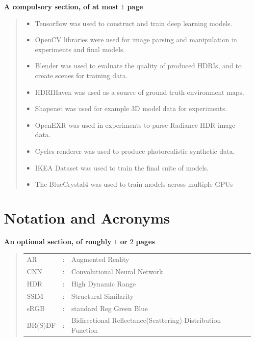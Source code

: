 \documentclass[ %
                    author={Gavin Parker},
                supervisor={Dr. Neill Campbell},
                    degree={MEng},
                     title={Deep Siamese Networks for Illumination Estimation from Stereo Images},
                  subtitle={},
                      type={research},
                      year={2018} ]{dissertation}
\begin{document}
{\bf A compulsory section, of at most $1$ page}
\vspace{1cm} 
\begin{quote}
\noindent
\begin{itemize}
\item Tensorflow was used to construct and train deep learning models.
\item OpenCV libraries were used for image parsing and manipulation in experiments and final models.
\item Blender was used to evaluate the quality of produced HDRIs, and to create scenes for training data.
\item HDRIHaven was used as a source of ground truth environment maps.
\item Shapenet was used for example 3D model data for experiments.
\item OpenEXR was used in experiments to parse Radiance HDR image data.
\item Cycles renderer was used to produce photorealistic synthetic data.
\item IKEA Dataset was used to train the final suite of models.
\item The BlueCrystal4 was used to train models across multiple GPUs
\end{itemize}
\end{quote}


\chapter*{Notation and Acronyms}

{\bf An optional section, of roughly $1$ or $2$ pages}
\vspace{1cm} 


\begin{quote}
\noindent
\begin{tabular}{lcl}
AR                 &:     & Augmented Reality                                         	\\
CNN                 &:     & Convolutional Neural Network                             	\\
HDR					&:		& High Dynamic Range										\\
SSIM				&:		& Structural Similarity										\\
sRGB				&:		& standard Reg Green Blue									\\
BR(S)DF				&:		& Bidirectional Reflectance(Scattering) Distribution Function
\end{tabular}
\end{quote}
\end{document}
